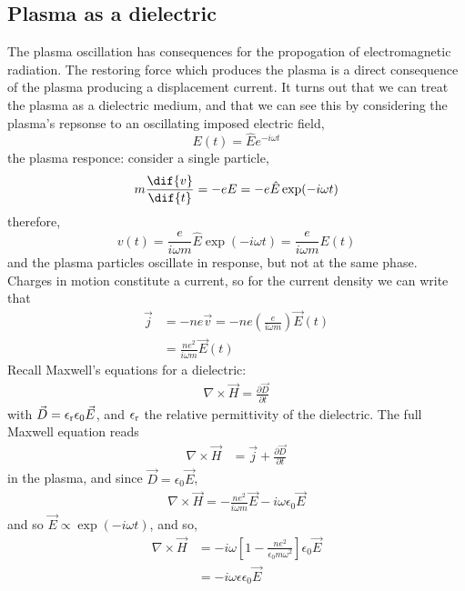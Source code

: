 \documentclass{book}         		                %
\begin{document}
\subsection{Plasma as a dielectric}
\label{sec:dielectric}

The plasma oscillation has consequences for the propogation of
electromagnetic radiation. The restoring force which produces the
plasma is a direct consequence of the plasma producing a displacement
current. It turns out that we can treat the plasma as a dielectric
medium, and that we can see this by considering the plasma's repsonse
to an oscillating imposed electric field,
\[ E(t) = \hat{E} e^{-i\omega t} \]
the plasma responce: consider a single particle,
\begin{equation} m \frac{\dif{v}}{\dif{t}} = -eE = -e \hat{E} \exp({-i \omega t})
\end{equation}
therefore, 
\[ v(t) = \frac{e}{i \omega m} \hat{E} \exp(-i \omega t) = \frac{e}{i
  \omega m} E(t)\] and the plasma particles oscillate in response, but
not at the same phase. Charges in motion constitute a current, so for
the current density we can write that
\begin{align} \vec{j} &= -n e \vec{v} = -ne \left( \frac{e}{i \omega m} \right) \vec{E}(t) \nonumber
 \\ &= \frac{ne^2}{i \omega m}\vec{E}(t) 
\end{align}
Recall Maxwell's equations for a dielectric:
\begin{align*}
  \nabla \times \vec{H} = \frac{\partial \vec D}{\partial t}
\end{align*}
with $\vec{D}= \epsilon_{{\rm r}} \epsilon_0 \vec{E}$, and $\epsilon_{\rm r}$ the relative permittivity of the dielectric.
The full Maxwell equation reads
\begin{align*}
  \nabla \times \vec{H} &= \vec{j} + \frac{\partial \vec D}{\partial t}
\end{align*}
in the plasma, and since $\vec{D} = \epsilon_0 \vec{E}$,
\begin{align*}
  \nabla \times \vec{H} = - \frac{n e^2}{i \omega m} \vec{E} - i \omega \epsilon_0 \vec{E}
\end{align*}
and so $\vec{E} \propto \exp(-i \omega t)$, and so,
\begin{align}
  \nabla \times \vec{H} &= - i \omega \left[ 1 - \frac{n e^2}{\epsilon_0 m \omega^2} \right] \epsilon_0 \vec{E} \\ &= -i \omega \epsilon \epsilon_0 \vec{E} \nonumber
\end{align}
\end{document}
